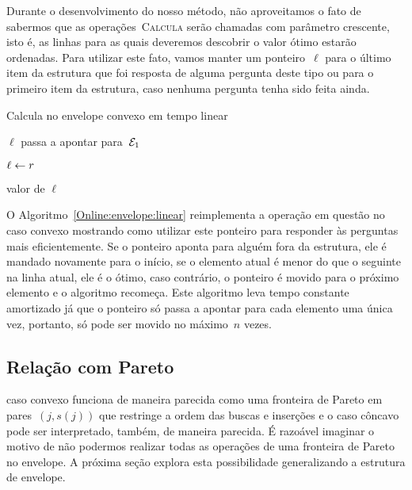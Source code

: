 Durante o desenvolvimento do nosso método, não aproveitamos o fato de sabermos que as operações~\textsc{Calcula} serão chamadas com parâmetro crescente, isto é, as linhas para as quais deveremos descobrir o valor ótimo estarão ordenadas. Para utilizar este fato, vamos manter um ponteiro~$\ell$ para o último item da estrutura que foi resposta de alguma pergunta deste tipo ou para o primeiro item da estrutura, caso nenhuma pergunta tenha sido feita ainda. 

\begin{algorithm}[h]
\caption{Calcula no envelope convexo em tempo linear}
\label{Online:envelope:linear}
\begin{algorithmic}[1]
        \State $\ell$ passa a apontar para~$\mathcal{E}_1$
    \EndIf
    
        \State $\ell \leftarrow r$
    \EndWhile

    \State \Return valor de $\ell$
\EndFunction
\end{algorithmic}
\end{algorithm}

O Algoritmo~\ref{Online:envelope:linear} reimplementa a operação em questão no caso convexo mostrando como utilizar este ponteiro para responder às perguntas mais eficientemente. Se o ponteiro aponta para alguém fora da estrutura, ele é mandado novamente para o início, se o elemento atual é menor do que o seguinte na linha atual, ele é o ótimo, caso contrário, o ponteiro é movido para o próximo elemento e o algoritmo recomeça. Este algoritmo leva tempo constante amortizado já que o ponteiro só passa a apontar para cada elemento uma única vez, portanto, só pode ser movido no máximo~$n$ vezes.


\subsection{Relação com Pareto}

 caso convexo funciona de maneira parecida como uma fronteira de Pareto em pares~$(j,s(j))$ que restringe a ordem das buscas e inserções e o caso côncavo pode ser interpretado, também, de maneira parecida. É razoável imaginar o motivo de não podermos realizar todas as operações de uma fronteira de Pareto no envelope. A próxima seção explora esta possibilidade generalizando a estrutura de envelope.
